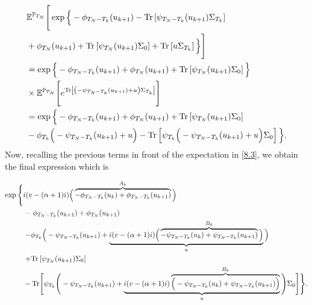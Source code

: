 \begin{align}
&\mathbb{E}^{\mathbb{P}_{T_{N}}}\Bigg[\exp\Big\{ -\phi_{T_{N}-T_{k}}(u_{k+1})-\textup{Tr}\left[\psi_{T_{N}-T_{k}}(u_{k+1})\Sigma_{T_{k}}\right]\Big. \Bigg. \nonumber\\
&\Bigg.\Big.+\phi_{T_{N}}(u_{k+1})+\textup{Tr}\left[\psi_{T_{N}}(u_{k+1})\Sigma_0 \right]+\textup{Tr}\left[u\Sigma_{T_{k}} \right]\Big\}\Bigg]\nonumber\\
&=\exp\Big\{ -\phi_{T_{N}-T_{k}}(u_{k+1})+\phi_{T_{N}}(u_{k+1})+\textup{Tr}\left[\psi_{T_{N}}(u_{k+1})\Sigma_0\right] \Big\}\nonumber\\
&\times\mathbb{E}^{\mathbb{P}_{T_{N}}}\Bigg[e^{\textup{Tr}\left[\left(-\psi_{T_{N}-T_{k}}(u_{k+1})+u \right)\Sigma_{T_{k}} \right]}\Bigg]\nonumber\\
&=\exp\Big\{ -\phi_{T_{N}-T_{k}}(u_{k+1})+\phi_{T_{N}}(u_{k+1})+\textup{Tr}\left[\psi_{T_{N}}(u_{k+1})\Sigma_0\right]\Big.\nonumber\\
&\Big. -\phi_{T_{k}}\Big(-\psi_{T_{N}-T_{k}}(u_{k+1})+u\Big) -\textup{Tr}\left[\psi_{T_{k}}\Big( -\psi_{T_{N}-T_{k}}(u_{k+1})+u\Big)\Sigma_0 \right]\Big\}.
\end{align}
Now, recalling the previous terms in front of the expectation in \eqref{8.3}, we obtain the final expression which is

\begin{align*}
\exp\Bigg\{ &i(v-(\alpha+1)i)\Big(\overbrace{-\phi_{T_{N}-T_{k}}(u_{k})+\phi_{T_{N}-T_{k}}(u_{k+1})}^{A_{k}} \Big)\Bigg.\nonumber\\
&-\left. \phi_{T_{N}-T_{k}}(u_{k+1})+\phi_{T_{N}}(u_{k+1})\right.\nonumber\\
&\left.-\phi_{T_{k}}\Big(-\psi_{T_{N}-T_{k}}(u_{k+1})+\underbrace{i(v-(\alpha+1)i)\Big(\overbrace{-\psi_{T_{N}-T_{k}}(u_{k})+\psi_{T_{N}-T_{k}}(u_{k+1})}^{B_{k}} \Big)}_{u} \Big)\right.\nonumber\\
&\left.+\textup{Tr}\left[\psi_{T_{N}}(u_{k+1})\Sigma_0\right] \right.\nonumber\\
&\Bigg. -\textup{Tr}\Bigg[\psi_{T_{k}}\Bigg(-\psi_{T_{N}-T_{k}}(u_{k+1})+\underbrace{i(v-(\alpha+1)i)\overbrace{\Big(-\psi_{T_{N}-T_{k}}(u_{k})+\psi_{T_{N}-T_{k}}(u_{k+1})\Big)}^{B_{k}}}_{u} \Bigg)\Sigma_0 \Bigg] \Bigg\}.
\end{align*}

